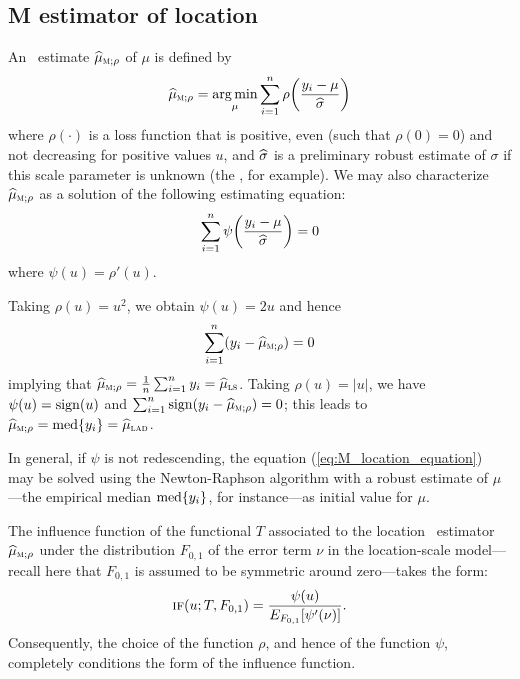 \subsection{M estimator of location}

An ~estimate $\sthat{\mu}_{\stsc{M};\rho}$ of $\mu$ is defined by
\[
    \sthat{\mu}_{\stsc{M};\rho} 
    = \argmin_\mu \sum_{i=1}^{n}\rho\left(\frac{y_i-\mu}{\sthat{\sigma}}\right)
\]
where $\rho(\cdot)$ is a loss function that is positive, even (such that
$\rho(0) = 0$) and not decreasing for positive values $u$, and $\widehat{\sigma}$
is a preliminary robust estimate of $\sigma$ if this scale parameter is unknown
(the , for example). We may also characterize
$\sthat{\mu}_{\stsc{M};\rho}$ as a solution of the following estimating
equation:
%
\begin{equation}
    \label{eq:M_location_equation}
    \sum_{i=1}^{n} \psi\left(\frac{y_i-\mu}{\sthat{\sigma}}\right) = 0
\end{equation}
%
where $\psi(u) = \rho'(u)$.

Taking $\rho(u) = u^2$, we obtain $\psi(u) = 2u$ and hence
\[
    \sum_{i=1}^{n} (y_i-\sthat{\mu}_{\stsc{M};\rho}) = 0
\]
implying that $\sthat{\mu}_{\stsc{M};\rho} = \frac{1}{n}\sum_{i=1}^{n} y_i =
\sthat{\mu}_\stsc{LS}$. Taking $\rho(u) = |u|$, we have $\psi(u) = \operatorname{sign}(u)$
and $\sum_{i=1}^{n} \sign(y_i-\sthat{\mu}_{\stsc{M};\rho}) = 0$; this leads to
$\sthat{\mu}_{\stsc{M};\rho} = \med\{ y_i\} = \sthat{\mu}_\stsc{LAD}$.

In general, if $\psi$ is not redescending, the equation
(\ref{eq:M_location_equation}) may be solved using the Newton-Raphson algorithm
with a robust estimate of $\mu$---the empirical median $\operatorname*{med}\{ y_i\}$, for
instance---as initial value for $\mu$.

The influence function of the functional $T$ associated to the location
~estimator $\sthat{\mu}_{\stsc{M};\rho}$ under the distribution $F_{0,1}$
of the error term $\nu$ in the location-scale model---recall here that
$F_{0,1}$ is assumed to be symmetric around zero---takes the form:
\[
    \stsc{IF}(u;T,F_{0,1}) = \frac{\psi(u)}{E_{F_{0,1}}[\psi'(\nu)]}.
\]
Consequently, the choice of the function $\rho$, and hence of the function
$\psi$, completely conditions the form of the influence function.

